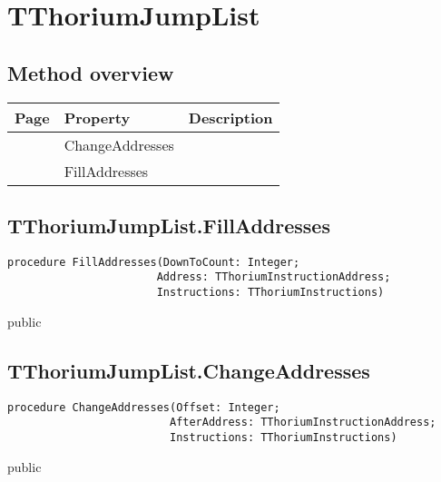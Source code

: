 \section{TThoriumJumpList}
\label{thoriumcore:thorium:tthoriumjumplist}
\subsection{Method overview}
\label{thoriumcore:thorium:tthoriumjumplist:methods}
\begin{tabularx}{\textwidth}{llX}
Page & Property & Description  \\ \hline
\pageref{thoriumcore:thorium:tthoriumjumplist:changeaddresses} & ChangeAddresses  &  \\
\pageref{thoriumcore:thorium:tthoriumjumplist:filladdresses} & FillAddresses  &  \\
\hline
\end{tabularx}
\subsection{TThoriumJumpList.FillAddresses}
\label{thoriumcore:thorium:tthoriumjumplist:filladdresses}
\begin{FPCList}
\Synopsis
\Declaration 

\begin{verbatim}
procedure FillAddresses(DownToCount: Integer;
                       Address: TThoriumInstructionAddress;
                       Instructions: TThoriumInstructions)
\end{verbatim}
\Visibility
public
\Description
\Errors
\end{FPCList}
\subsection{TThoriumJumpList.ChangeAddresses}
\label{thoriumcore:thorium:tthoriumjumplist:changeaddresses}
\begin{FPCList}
\Synopsis
\Declaration 

\begin{verbatim}
procedure ChangeAddresses(Offset: Integer;
                         AfterAddress: TThoriumInstructionAddress;
                         Instructions: TThoriumInstructions)
\end{verbatim}
\Visibility
public
\Description
\Errors
\end{FPCList}
